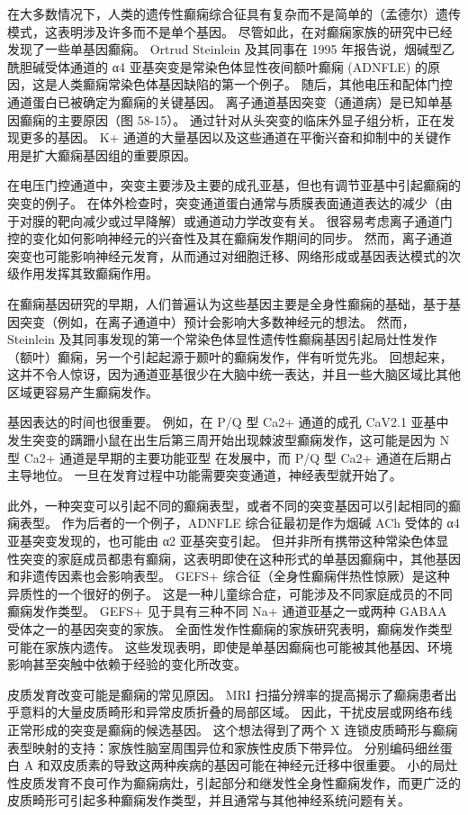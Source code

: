 在大多数情况下，人类的遗传性癫痫综合征具有复杂而不是简单的（孟德尔）遗传模式，这表明涉及许多而不是单个基因。
尽管如此，在对癫痫家族的研究中已经发现了一些单基因癫痫。
Ortrud Steinlein 及其同事在 1995 年报告说，烟碱型乙酰胆碱受体通道的 α4 亚基突变是常染色体显性夜间额叶癫痫 (ADNFLE) 的原因，这是人类癫痫常染色体基因缺陷的第一个例子。
随后，其他电压和配体门控通道蛋白已被确定为癫痫的关键基因。
离子通道基因突变（通道病）是已知单基因癫痫的主要原因（图 58-15）。
通过针对从头突变的临床外显子组分析，正在发现更多的基因。
K+ 通道的大量基因以及这些通道在平衡兴奋和抑制中的关键作用是扩大癫痫基因组的重要原因。


在电压门控通道中，突变主要涉及主要的成孔亚基，但也有调节亚基中引起癫痫的突变的例子。
在体外检查时，突变通道蛋白通常与质膜表面通道表达的减少（由于对膜的靶向减少或过早降解）或通道动力学改变有关。
很容易考虑离子通道门控的变化如何影响神经元的兴奋性及其在癫痫发作期间的同步。
然而，离子通道突变也可能影响神经元发育，从而通过对细胞迁移、网络形成或基因表达模式的次级作用发挥其致癫痫作用。


在癫痫基因研究的早期，人们普遍认为这些基因主要是全身性癫痫的基础，基于基因突变（例如，在离子通道中）预计会影响大多数神经元的想法。
然而，Steinlein 及其同事发现的第一个常染色体显性遗传性癫痫基因引起局灶性发作（额叶）癫痫，另一个引起起源于颞叶的癫痫发作，伴有听觉先兆。
回想起来，这并不令人惊讶，因为通道亚基很少在大脑中统一表达，并且一些大脑区域比其他区域更容易产生癫痫发作。


基因表达的时间也很重要。
例如，在 P/Q 型 Ca2+ 通道的成孔 CaV2.1 亚基中发生突变的蹒跚小鼠在出生后第三周开始出现棘波型癫痫发作，这可能是因为 N 型 Ca2+ 通道是早期的主要功能亚型 在发展中，而 P/Q 型 Ca2+ 通道在后期占主导地位。
一旦在发育过程中功能需要突变通道，神经表型就开始了。


此外，一种突变可以引起不同的癫痫表型，或者不同的突变基因可以引起相同的癫痫表型。
作为后者的一个例子，ADNFLE 综合征最初是作为烟碱 ACh 受体的 α4 亚基突变发现的，也可能由 α2 亚基突变引起。
但并非所有携带这种常染色体显性突变的家庭成员都患有癫痫，这表明即使在这种形式的单基因癫痫中，其他基因和非遗传因素也会影响表型。
GEFS+ 综合征（全身性癫痫伴热性惊厥）是这种异质性的一个很好的例子。 这是一种儿童综合症，可能涉及不同家庭成员的不同癫痫发作类型。
GEFS+ 见于具有三种不同 Na+ 通道亚基之一或两种 GABAA 受体之一的基因突变的家族。
全面性发作性癫痫的家族研究表明，癫痫发作类型可能在家族内遗传。
这些发现表明，即使是单基因癫痫也可能被其他基因、环境影响甚至突触中依赖于经验的变化所改变。


皮质发育改变可能是癫痫的常见原因。
MRI 扫描分辨率的提高揭示了癫痫患者出乎意料的大量皮质畸形和异常皮质折叠的局部区域。
因此，干扰皮层或网络布线正常形成的突变是癫痫的候选基因。
这个想法得到了两个 X 连锁皮质畸形与癫痫表型映射的支持：家族性脑室周围异位和家族性皮质下带异位。
分别编码细丝蛋白 A 和双皮质素的导致这两种疾病的基因可能在神经元迁移中很重要。
小的局灶性皮质发育不良可作为癫痫病灶，引起部分和继发性全身性癫痫发作，而更广泛的皮质畸形可引起多种癫痫发作类型，并且通常与其他神经系统问题有关。


